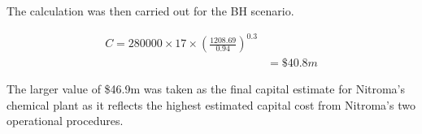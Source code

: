 The calculation was then carried out for the BH scenario.

\begin{equation}
\begin{split} 
C=280000 \times 17 \times \left(\frac{1208.69}{0.94}\right)^{0.3}  \\
 & =\$40.8m 
\end{split}
\end{equation}

The larger value of \$46.9m was taken as the final capital estimate for Nitroma's chemical plant as it reflects the highest estimated capital cost from Nitroma's two operational procedures.